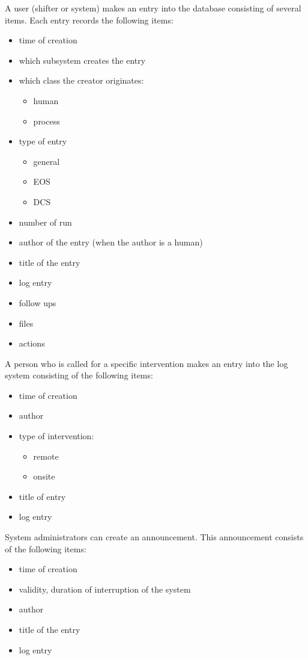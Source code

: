 \documentclass[a4paper,11pt]{book}
\begin{document}
A user (shifter or system) makes an entry into the database consisting of several items. Each entry records the following items:
\begin{itemize}
  \item time of creation
  \item which subsystem creates the entry
  \item which class the creator originates:
  \begin{itemize}
    \item human
    \item process
  \end{itemize}
  \item type of entry
  \begin{itemize}
    \item general
    \item EOS
    \item DCS
  \end{itemize}
  \item number of run
  \item author of the entry (when the author is a human)
  \item title of the entry
  \item log entry
  \item follow ups
  \item files
  \item actions
\end{itemize}

A person who is called for a specific intervention makes an entry into the log system consisting of the following items:
\begin{itemize}
  \item time of creation
  \item author
  \item type of intervention:
  \begin{itemize}
    \item remote
    \item onsite
  \end{itemize}
  \item title of entry
  \item log entry
\end{itemize}

System administrators can create an announcement. This announcement consists of the following items:
\begin{itemize}
  \item time of creation
  \item validity, duration of interruption of the system
  \item author
  \item title of the entry
  \item log entry
\end{itemize}
\end{document}
